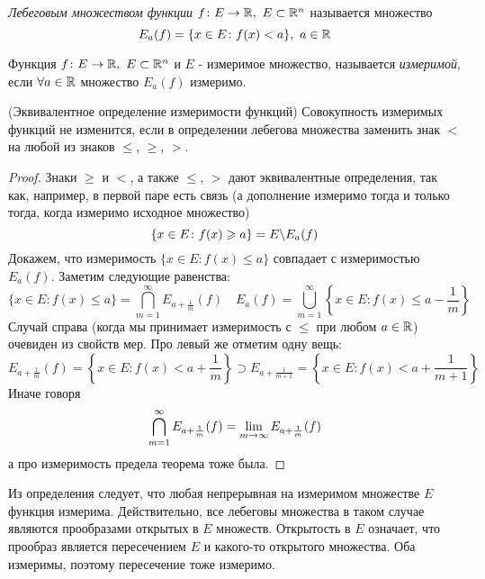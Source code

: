 \begin{definition}
	\textit{Лебеговым множеством функции} $f \colon E \to \mathbb{R},\ E \subset \mathbb{R}^n$ называется множество
	\[
		E_a(f) = \{x \in E \colon f(x) < a\},\ a \in \mathbb{R}
	\]
\end{definition}

\begin{definition}
	Функция $f \colon E \to \mathbb{R},\ E \subset \mathbb{R}^n$ и $E$ - измеримое множество, называется \textit{измеримой}, если $\forall a \in \mathbb{R}$ множество $E_a(f)$ измеримо.
\end{definition}

\begin{theorem} (Эквивалентное определение измеримости функций)
	Совокупность измеримых функций не изменится, если в определении лебегова множества заменить знак $<$ на любой из знаков $\le$, $\ge$, $>$.
\end{theorem}

\begin{proof}
	Знаки $\ge$ и $<$, а также $\le$, $>$ дают эквивалентные определения, так как, например, в первой паре есть связь (а дополнение измеримо тогда и только тогда, когда измеримо исходное множество)
	\[
		\{x \in E \colon f(x) \geqslant a\} = E \backslash E_a(f)
	\]
	Докажем, что измеримость $\{x \in E \colon f(x) \le a\}$ совпадает с измеримостью $E_a(f)$. Заметим следующие равенства:
	\[
		\{x \in E \colon f(x) \le a\} = \bigcap_{m = 1}^\infty E_{a + \frac{1}{m}}(f) \quad E_a(f) = \bigcup_{m = 1}^\infty \left\{x \in E \colon f(x) \le a - \frac{1}{m}\right\}
	\]
	Случай справа (когда мы принимает измеримость с $\le$ при любом $a \in \mathbb{R}$) очевиден из свойств мер. Про левый же отметим одну вещь:
	\[
		E_{a + \frac{1}{m}}(f) = \left\{x \in E \colon f(x) < a + \frac{1}{m}\right\} \supset E_{a + \frac{1}{m + 1}} = \left\{x \in E \colon f(x) < a + \frac{1}{m + 1}\right\}
	\]
	Иначе говоря
	\[
		\bigcap_{m = 1}^\infty E_{a + \frac{1}{m}}(f) = \lim\limits_{m \to \infty} E_{a + \frac{1}{m}}(f)
	\]
	а про измеримость предела теорема тоже была.
\end{proof}

\begin{note}
	Из определения следует, что любая непрерывная на измеримом множестве $E$ функция измерима. Действительно, все лебеговы множества в таком случае являются прообразами открытых в $E$ множеств. Открытость в $E$ означает, что прообраз является пересечением $E$ и какого-то открытого множества. Оба измеримы, поэтому пересечение тоже измеримо.
\end{note}

